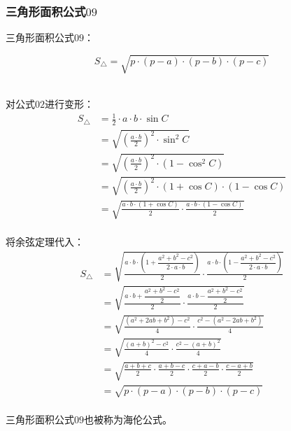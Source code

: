 \documentclass[UTF8]{ctexart}
\begin{document}
\subsubsection{三角形面积公式$09$}
    三角形面积公式$09$：
    \begin{large}
        \begin{equation*}
            S_{\triangle}=\sqrt{p\cdot(p-a)\cdot(p-b)\cdot(p-c)}
        \end{equation*}
    \end{large}\\
    对公式$02$进行变形：
    \setcounter{equation}{0}
    \begin{align}
        S_{\triangle}
        &=\frac{1}{2}\cdot a\cdot b\cdot\sin{C}\\[3mm]
        &=\sqrt{\left(\frac{a\cdot b}{2}\right)^2\cdot\sin^2{C}}\\[3mm]
        &=\sqrt{\left(\frac{a\cdot b}{2}\right)^2\cdot\left(1-\cos^2{C}\right)}\\[3mm]
        &=\sqrt{\left(\frac{a\cdot b}{2}\right)^2\cdot(1+\cos{C})\cdot(1-\cos{C})}\\[3mm]
        &=\sqrt{\frac{a\cdot b\cdot(1+\cos{C})}{2}\cdot\frac{a\cdot b\cdot(1-\cos{C})}{2}}
    \end{align}\\
    将余弦定理代入：
    \begin{align}
        S_{\triangle}
        &=\sqrt{\frac{a\cdot b\cdot\left(1+\dfrac{a^2+b^2-c^2}{2\cdot a\cdot b}\right)}{2}\cdot\frac{a\cdot b\cdot\left(1-\dfrac{a^2+b^2-c^2}{2\cdot a\cdot b}\right)}{2}}\\[3mm]
        &=\sqrt{\frac{a\cdot b+\dfrac{a^2+b^2-c^2}{2}}{2}\cdot\frac{a\cdot b-\dfrac{a^2+b^2-c^2}{2}}{2}}\\[3mm]
        &=\sqrt{\frac{\left(a^2+2ab+b^2\right)-c^2}{4}\cdot\frac{c^2-\left(a^2-2ab+b^2\right)}{4}}\\[3mm]
        &=\sqrt{\frac{\left(a+b\right)^2-c^2}{4}\cdot\frac{c^2-\left(a+b\right)^2}{4}}\\[3mm]
        &=\sqrt{\frac{a+b+c}{2}\cdot\frac{a+b-c}{2}\cdot\frac{c+a-b}{2}\cdot\frac{c-a+b}{2}}\\[3mm]
        &=\sqrt{p\cdot(p-a)\cdot(p-b)\cdot(p-c)}
    \end{align}\\
    三角形面积公式$09$也被称为海伦公式。

\newpage
\end{document}
